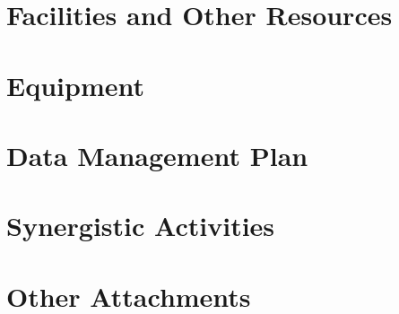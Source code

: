 \documentclass[11pt]{article}
\begin{document}
\thispagestyle{empty}
\AddToShipoutPicture*{\BackgroundPic}


\clearpage
\ifdefined\tocflag
\thispagestyle{empty}
\tableofcontents
\clearpage
\fi
{}

\thispagestyle{fancy}
\setlength{\headheight}{19.7478pt}
\setlength{\headsep}{4pt}
\newlength{\nsfoffset}
\setlength{\nsfoffset}{\headheight}
\addtolength{\nsfoffset}{\baselineskip}



\clearpage
\appendix


\clearpage

\section{Facilities and Other Resources}\label{sec:facilities}


\section{Equipment}\label{sec:equipment}


\clearpage
\section{Data Management Plan}\label{sec:dataplan}


\clearpage
\section{Synergistic Activities}\label{sec:synergy}




% 

\clearpage
\section{Other Attachments}\label{sec:other}


% 
\end{document}
